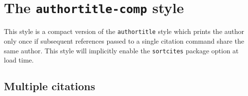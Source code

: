 \documentclass[a4paper]{article}
\begin{document}
\section*{The \texttt{authortitle-comp} style}

This style is a compact version of the \texttt{authortitle} style
which prints the author only once if subsequent references passed to
a single citation command share the same author. This style will
implicitly enable the \texttt{sortcites} package option at load
time.

\subsection*{Multiple citations}

\cite{aristotle:rhetoric,averroes/bland,aristotle:physics,aristotle:poetics}

\clearpage
\printbibliography
\end{document}
